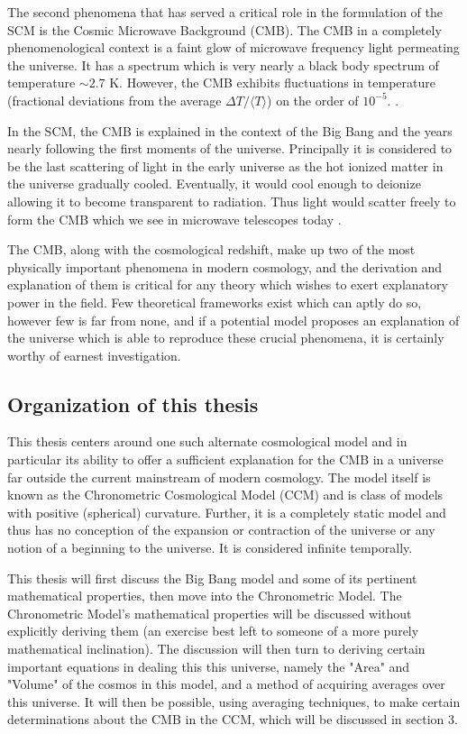 \documentclass[a4paper]{article}
\begin{document}
    The second phenomena that has served a critical role in the formulation of
    the SCM is the Cosmic Microwave Background (CMB). The CMB in a completely
    phenomenological context is a faint glow of microwave frequency light
    permeating the universe. It has a spectrum which is very nearly a black
    body spectrum of temperature $\sim 2.7$ K. However, the CMB exhibits
    fluctuations in temperature (fractional deviations from the average $\Delta
    T/\langle T \rangle$) on the order of $10^{-5}$.
    \cite{cmb4ped}.

    In the SCM, the CMB is explained in the context of the Big Bang and the
    years nearly following the first moments of the universe. Principally it is
    considered to be the last scattering of light in the early universe as the
    hot ionized matter in the universe gradually cooled. Eventually, it would
    cool enough to deionize allowing it to become transparent to radiation.
    Thus light would scatter freely to form the CMB which we see in microwave
    telescopes today \cite{cmb4ped}. 

    The CMB, along with the cosmological redshift, make up two of the most
    physically important phenomena in modern cosmology, and the derivation and
    explanation of them is critical for any theory which wishes to exert
    explanatory power in the field. Few theoretical frameworks exist which can
    aptly do so, however few is far from none, and if a potential model proposes an
    explanation of the universe which is able to reproduce these crucial
    phenomena, it is certainly worthy of earnest investigation.

    
    \subsection{Organization of this thesis}
    This thesis centers around one such alternate cosmological model and in
    particular its ability to offer a sufficient explanation for the
    CMB in a universe far outside the current mainstream of
    modern cosmology. The model itself is known as the Chronometric
    Cosmological Model (CCM) \cite{segal} and is class of models with positive
    (spherical) curvature. Further, it is a completely static model and thus
    has no conception of the expansion or contraction of the universe or any
    notion of a beginning to the universe. It is considered infinite
    temporally.

    This thesis will first discuss the Big Bang model and some of its
    pertinent mathematical properties, then move into the Chronometric Model.
    The Chronometric Model's mathematical properties will be discussed without
    explicitly deriving them (an exercise best left to someone of a more purely
    mathematical inclination). The discussion will then turn to deriving
    certain important equations in dealing this this universe, namely the
    "Area" and "Volume" of the cosmos in this model, and a method of acquiring
    averages over this universe. It will then be possible, using averaging
    techniques, to make certain determinations about the CMB in the CCM, which
    will be discussed in section 3.
\end{document}
